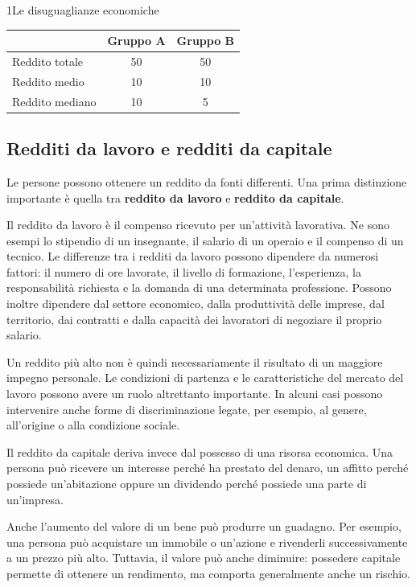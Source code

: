 \begin{lettura}{1}{Le disuguaglianze economiche}
\begin{center}
\begin{minipage}{\linewidth}\centering\small
\begin{tabular}{lcc}
\toprule
 & Gruppo A & Gruppo B \\
\midrule
Reddito totale & 50 & 50 \\
Reddito medio & 10 & 10 \\
Reddito mediano & 10 & 5 \\
\bottomrule
\end{tabular}
\end{minipage}
\end{center}

\subsection*{Redditi da lavoro e redditi da capitale}
Le persone possono ottenere un reddito da fonti differenti. Una prima distinzione importante è quella tra \textbf{reddito da lavoro} e \textbf{reddito da capitale}.

Il reddito da lavoro è il compenso ricevuto per un'attività lavorativa. Ne sono esempi lo stipendio di un insegnante, il salario di un operaio e il compenso di un tecnico. Le differenze tra i redditi da lavoro possono dipendere da numerosi fattori: il numero di ore lavorate, il livello di formazione, l'esperienza, la responsabilità richiesta e la domanda di una determinata professione. Possono inoltre dipendere dal settore economico, dalla produttività delle imprese, dal territorio, dai contratti e dalla capacità dei lavoratori di negoziare il proprio salario.

Un reddito più alto non è quindi necessariamente il risultato di un maggiore impegno personale. Le condizioni di partenza e le caratteristiche del mercato del lavoro possono avere un ruolo altrettanto importante. In alcuni casi possono intervenire anche forme di discriminazione legate, per esempio, al genere, all'origine o alla condizione sociale.

Il reddito da capitale deriva invece dal possesso di una risorsa economica. Una persona può ricevere un interesse perché ha prestato del denaro, un affitto perché possiede un'abitazione oppure un dividendo perché possiede una parte di un'impresa.

Anche l'aumento del valore di un bene può produrre un guadagno. Per esempio, una persona può acquistare un immobile o un'azione e rivenderli successivamente a un prezzo più alto. Tuttavia, il valore può anche diminuire: possedere capitale permette di ottenere un rendimento, ma comporta generalmente anche un rischio.


\end{lettura}
